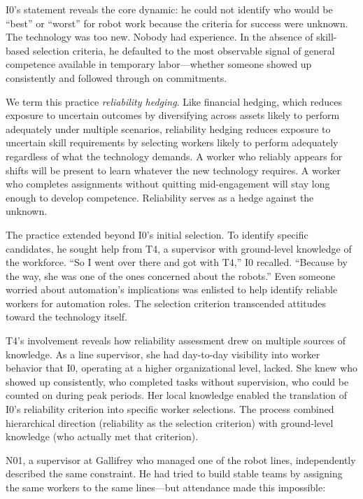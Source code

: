 \documentclass[12pt]{article}
\begin{document}
I0's statement reveals the core dynamic: he could not identify who would be ``best'' or ``worst'' for robot work because the criteria for success were unknown. The technology was too new. Nobody had experience. In the absence of skill-based selection criteria, he defaulted to the most observable signal of general competence available in temporary labor---whether someone showed up consistently and followed through on commitments.

We term this practice \textit{reliability hedging}. Like financial hedging, which reduces exposure to uncertain outcomes by diversifying across assets likely to perform adequately under multiple scenarios, reliability hedging reduces exposure to uncertain skill requirements by selecting workers likely to perform adequately regardless of what the technology demands. A worker who reliably appears for shifts will be present to learn whatever the new technology requires. A worker who completes assignments without quitting mid-engagement will stay long enough to develop competence. Reliability serves as a hedge against the unknown.

The practice extended beyond I0's initial selection. To identify specific candidates, he sought help from T4, a supervisor with ground-level knowledge of the workforce. ``So I went over there and got with T4,'' I0 recalled. ``Because by the way, she was one of the ones concerned about the robots.'' Even someone worried about automation's implications was enlisted to help identify reliable workers for automation roles. The selection criterion transcended attitudes toward the technology itself.

T4's involvement reveals how reliability assessment drew on multiple sources of knowledge. As a line supervisor, she had day-to-day visibility into worker behavior that I0, operating at a higher organizational level, lacked. She knew who showed up consistently, who completed tasks without supervision, who could be counted on during peak periods. Her local knowledge enabled the translation of I0's reliability criterion into specific worker selections. The process combined hierarchical direction (reliability as the selection criterion) with ground-level knowledge (who actually met that criterion).

N01, a supervisor at Gallifrey who managed one of the robot lines, independently described the same constraint. He had tried to build stable teams by assigning the same workers to the same lines---but attendance made this impossible:
\end{document}

